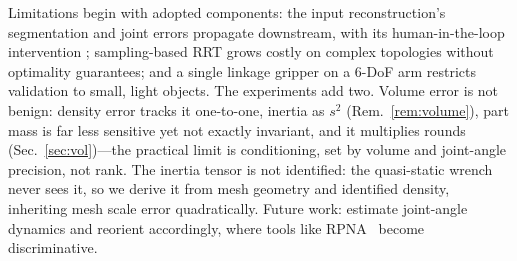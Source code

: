 Limitations begin with adopted components: the input reconstruction's
segmentation and joint errors propagate downstream, with its
human-in-the-loop intervention \cite{lee2026rora}; sampling-based RRT grows
costly on complex topologies without optimality guarantees; and a single
linkage gripper on a 6-DoF arm restricts validation to small, light
objects. The experiments add two. Volume error is not benign: density error tracks
it one-to-one, inertia as $s^2$ (Rem.~\ref{rem:volume}), part mass is far
less sensitive yet not exactly invariant, and it multiplies rounds
(Sec.~\ref{sec:vol})---the practical limit is conditioning, set by volume
and joint-angle precision, not rank. The inertia tensor is not identified: the quasi-static
wrench never sees it, so we derive it from mesh geometry and
identified density, inheriting mesh scale error quadratically. Future work: estimate joint-angle dynamics and reorient accordingly, where
tools like RPNA~\cite{wensing2024geometric} become
discriminative.

